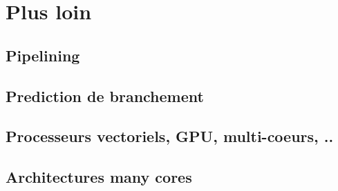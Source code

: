 \chapter{Plus loin}
\section{Pipelining}
\section{Prediction de branchement}
\section{Processeurs vectoriels, GPU, multi-coeurs, ..}
\section{Architectures many cores}
